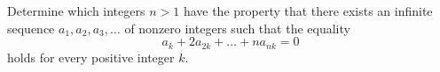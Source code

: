 Determine which integers $n > 1$ have the property that there exists an infinite sequence $a_1, a_2, a_3, \ldots$ of nonzero integers such that the equality \[a_k+2a_{2k}+\ldots+na_{nk}=0\]holds for every positive integer $k$.